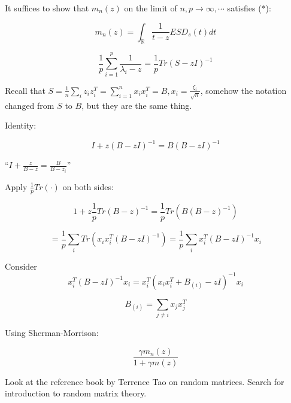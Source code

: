 \documentclass[12pt]{article}
\theoremstyle{plain}
\begin{document}
It suffices to show that $m_n (z)$ on the limit of $n, p \rightarrow \infty, \cdots$ satisfies (*):


$$ m_n(z) = \int_\mathbb{R} \frac{1}{t-z}  ESD_{s}(t) dt $$

$$ \frac{1}{p} \sum_{i=1}^p \frac{1}{\lambda_i - z} = \frac{1}{p} Tr(S - z I)^{-1} $$

Recall that $S = \frac{1}{n} \sum_{i} z_i z_i^T = \sum_{i=1}^n x_i x_i^T = B, x_i = \frac{\xi_i}{\sqrt{n}} $, somehow the notation changed from $S$ to $B$, but they are the same thing.

Identity:

$$ I + z(B-z I)^{-1}= B(B- z I)^{-1} $$

``$I + \frac{z}{B-z} = \frac{B}{B-z_i}$''

Apply $\frac{1}{p} Tr(\cdot)$ on both sides:

$$ 1 + z \frac{1}{p} Tr(B - z)^{-1} = \frac{1}{p} Tr(B (B- z)^{-1}) $$

$$ = \frac{1}{p} \sum_i Tr(x_i x_i^T (B- z I)^{-1}) = \frac{1}{p} \sum_i x_i^T(B - z I)^{-1} x_i  $$

Consider
$$ x_i^T(B - z I)^{-1} x_i = x_i^T(x_ix_i^T + B_{(i)}  - z I)^{-1} x_i $$

$$ B_{(i)} = \sum_{j \neq i} x_j x_j^T $$

Using Sherman-Morrison:

$$ \frac{\gamma m_n(z)}{1+\gamma m(z)} $$

Look at the reference book by Terrence Tao on random matrices. Search for introduction to random matrix theory.
\end{document}
